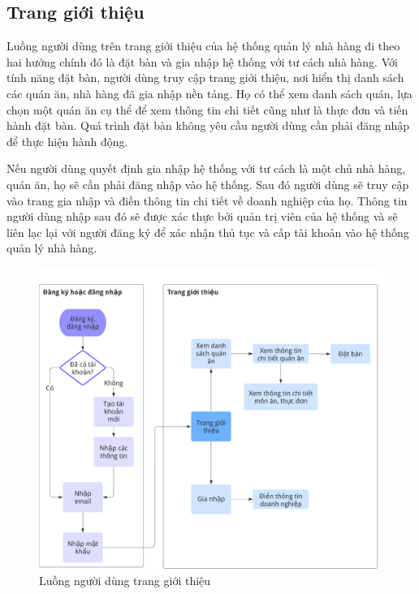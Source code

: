 \subsection{Trang giới thiệu}
Luồng người dùng trên trang giới thiệu của hệ thống quản lý nhà hàng đi theo hai hướng chính đó là đặt bàn và gia nhập hệ thống với tư cách nhà hàng.
Với tính năng đặt bàn, người dùng truy cập trang giới thiệu, nơi hiển thị danh sách các quán ăn, nhà hàng đã gia nhập nền tảng.
Họ có thể xem danh sách quán, lựa chọn một quán ăn cụ thể để xem thông tin chi tiết cũng như là thực đơn và tiến hành đặt bàn.
Quá trình đặt bàn không yêu cầu người dùng cần phải đăng nhập để thực hiện hành động.

Nếu người dùng quyết định gia nhập hệ thống với tư cách là một chủ nhà hàng, quán ăn, họ sẽ cần phải đăng nhập vào hệ thống.
Sau đó người dùng sẽ truy cập vào trang gia nhập và điền thông tin chi tiết về doanh nghiệp của họ.
Thông tin người dùng nhập sau đó sẽ được xác thực bởi quản trị viên của hệ thống và sẽ liên lạc lại với người đăng ký để xác nhận thủ tục và cấp tài khoản vào hệ thống quản lý nhà hàng.
\begin{figure}[H]
	\centering
	\includegraphics[width=\textwidth]{images/hChip/main-flow/landing-page-user-journey-flow.png}
	\caption{Luồng người dùng trang giới thiệu }
	\label{fig:landing-page-user-journey}
\end{figure}
